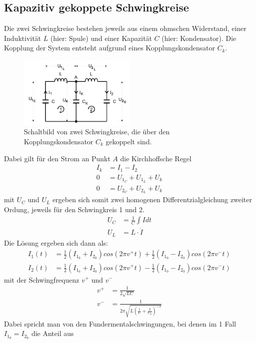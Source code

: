\subsection{Kapazitiv gekoppete Schwingkreise}
Die zwei Schwingkreise bestehen jeweils aus einem ohmschen Widerstand, einer Induktivität $L$
(hier: Spule) und einer Kapazität $C$ (hier: Kondensator). Die Kopplung der System 
entsteht aufgrund eines Kopplungskondensator $C_k$.\\
\begin{figure}[H]
    \centering
    \includegraphics[width=0.5\textwidth]{bilder/schwingkreis_allgemein.jpg}
    \caption{Schaltbild von zwei Schwingkreise, die über den Kopplungskondensator $C_k$ gekoppelt sind. \cite[299]{Anleitung}}
\end{figure} 
Dabei gilt für den Strom an Punkt $A$ die Kirchhoffsche Regel
\begin{align}
    I_k&=I_1-I_2 \\
    0&=U_{1_C}+U_{1_L}+U_k\\
    0&=U_{2_C}+U_{2_L}+U_k
\end{align}
mit $U_C$ und $U_L$ ergeben sich somit zwei homogenen Differentzialgleichung zweiter Ordung, 
jeweils für den Schwingkreis 1 und 2. 
\begin{align}
    U_C&=\frac{1}{C}\int{I dt}\\
    U_L&=L \cdot \dot{I}
\end{align}
Die Lösung ergeben sich dann als:
\begin{align}
    I_1(t)&=\frac{1}{2}(I_{1_0}+I_{2_0})cos(2 \pi v^+ t)+\frac{1}{2}(I_{1_0}-I_{2_0})cos(2 \pi v^- t)\\
    I_2(t)&=\frac{1}{2}(I_{1_0}+I_{2_0})cos(2 \pi v^+ t)-\frac{1}{2}(I_{1_0}-I_{2_0})cos(2 \pi v^- t)
\end{align}
mit der Schwingfrequenz $v^+$ und $v^-$ 
\begin{align}
    v^+&=\frac{1}{2\sqrt{LC}}\\
    v^-&=\frac{1}{2 \pi \sqrt{L(\frac{1}{C}+\frac{2}{C_k})^{-1}}}
\end{align}
Dabei spricht man von den Fundermentalschwingungen, bei denen im 1 Fall $I_{1_0}=I_{2_0}$ die Anteil  aus
